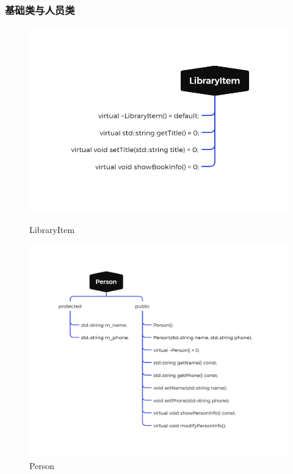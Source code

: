 \documentclass[12pt,twoside]{ctexart}
\begin{document}
\subsubsection{基础类与人员类}
\begin{figure}[H]
    \centering
    \begin{minipage}{0.45\textwidth}
        \centering
        \includegraphics[width=\textwidth]{Pic/LibraryManagement/LibraryItem.png}
        \caption{LibraryItem}
    \end{minipage}\hfill
    \begin{minipage}{0.45\textwidth}
        \centering
        \includegraphics[width=\textwidth]{Pic/LibraryManagement/Person.png}
        \caption{Person}
    \end{minipage}
\end{figure}
\end{document}
